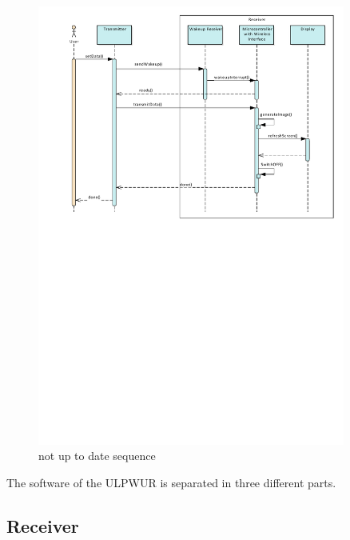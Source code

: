 \begin{figure}[ht]
	\centering
	\includegraphics[width=0.9\textwidth]{4-development/software/graphics/sequence.pdf}
	\caption{not up to date sequence\label{software:sequence}}
\end{figure}

The software of the ULPWUR is separated in three different parts. 


\subsection{Receiver}

